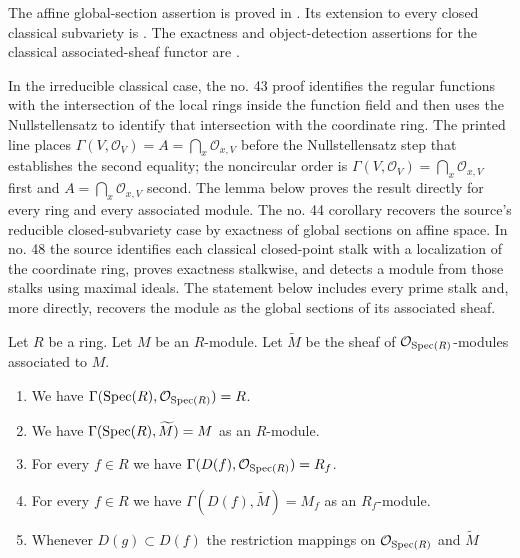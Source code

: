\begin{lemma}
\label{lemma-spec-sheaves}
\begin{reference}
\cite[Chapter II, \S 1, no. 31, p. 224]{FAC}
The affine global-section assertion is proved in
\cite[Chapter II, \S 3, no. 43, Proposition 4, p. 235]{FAC}.
Its extension to every closed classical subvariety is
\cite[Chapter II, \S 3, no. 44, Proposition 7, Corollary 3,
p. 237]{FAC}.
The exactness and object-detection assertions for the classical
associated-sheaf functor are
\cite[Chapter II, \S 4, no. 48, Propositions 1 and 2,
pp. 240--241]{FAC}.
\end{reference}
\begin{history}
In the irreducible classical case, the no. 43 proof identifies the
regular functions with the intersection of the local rings inside the
function field and then uses the Nullstellensatz to identify that intersection
with the coordinate ring. The printed line places
$\Gamma(V, \mathcal{O}_V)=A=\bigcap_x\mathcal{O}_{x,V}$ before the
Nullstellensatz step that establishes the second equality; the noncircular
order is $\Gamma(V, \mathcal{O}_V)=\bigcap_x\mathcal{O}_{x,V}$ first and
$A=\bigcap_x\mathcal{O}_{x,V}$ second. The lemma below proves the result
directly for every ring and every associated module. The no. 44 corollary
recovers the source's reducible closed-subvariety case by exactness of global
sections on affine space. In no. 48 the source identifies each classical
closed-point stalk with a localization of the coordinate ring, proves
exactness stalkwise, and detects a module from those stalks using maximal
ideals. The statement below includes every prime stalk and, more directly,
recovers the module as the global sections of its associated sheaf.
\end{history}
Let $R$ be a ring. Let $M$ be an $R$-module. Let $\widetilde M$
be the sheaf of $\mathcal{O}_{\mathop{\mathrm{Spec}}(R)}$-modules
associated to $M$.
\begin{enumerate}
\item We have $\Gamma(\mathop{\mathrm{Spec}}(R), \mathcal{O}_{\mathop{\mathrm{Spec}}(R)}) = R$.
\item We have $\Gamma(\mathop{\mathrm{Spec}}(R), \widetilde M) = M$ as an $R$-module.
\item For every $f \in R$ we have
$\Gamma(D(f), \mathcal{O}_{\mathop{\mathrm{Spec}}(R)}) = R_f$.
\item For every $f\in R$ we have $\Gamma(D(f), \widetilde M) = M_f$
as an $R_f$-module.
\item Whenever $D(g) \subset D(f)$ the restriction mappings
on $\mathcal{O}_{\mathop{\mathrm{Spec}}(R)}$ and $\widetilde M$

\end{enumerate}
\end{lemma}
